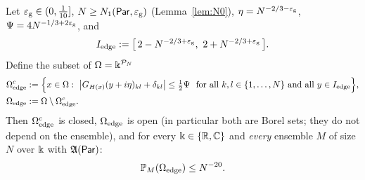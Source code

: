 \begin{lemma}\label{lem:edge}
Let $\eg\in(0,\frac1{10}]$, $N\ge N_1(\Par,\eg)$ \textup{(Lemma~\ref{lem:N0})}, $\eta=N^{-2/3-\eg}$, $\Psi=4N^{-1/3+2\eg}$, and
\[
I_{\rm edge}:=\big[\,2-N^{-2/3+\eg},\ 2+N^{-2/3+\eg}\,\big].
\]
Define the subset of $\Omega=\K^{\mathcal P_N}$
\begin{align*}
\Omega^c_{\rm edge}&:=\Big\{x\in\Omega:\ \big|G_{H(x)}(y+i\eta)_{kl}+\delta_{kl}\big|\le\tfrac12\Psi\ \ \text{for all }k,l\in\{1,\dots,N\}\text{ and all }y\in I_{\rm edge}\Big\},\\
\Omega_{\rm edge}&:=\Omega\setminus\Omega^c_{\rm edge}.
\end{align*}
Then $\Omega^c_{\rm edge}$ is closed, $\Omega_{\rm edge}$ is open (in particular both are Borel sets; they do not depend on the ensemble), and for every $\K\in\{\R,\C\}$ and
\emph{every} ensemble $M$ of size $N$ over $\K$ with $\fA(\Par)$:
\[
\P_M(\Omega_{\rm edge})\le N^{-20}.
\]
\end{lemma}
